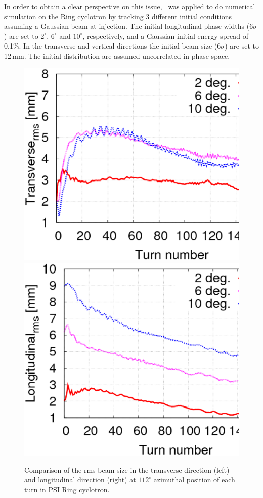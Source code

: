 \documentclass{JAC2003}
\begin{document}
In order to obtain a clear perspective on this issue, \opalcycl \  was applied to do numerical simulation on the Ring cyclotron by tracking 3
different initial conditions assuming a Gaussian beam at injection. The initial longitudinal phase widths (6$\sigma$) are set to $2^\circ$, $6^\circ$ and $10^\circ$, respectively,
and a Gaussian initial energy spread of 0.1\%. In the transverse and vertical directions the initial beam size (6$\sigma$) are set to 12\,mm. 
The initial distribution are assumed uncorrelated in phase space.
\begin{figure}
  \centering
  \includegraphics*[width=0.45\linewidth]{figures/Comp-Transverse.ps}
  \includegraphics*[width=0.45\linewidth]{figures/Comp-Longitudinal.ps}
  \caption{Comparison of the rms beam size in the transverse direction (left) and longitudinal direction (right) at $112^\circ$ azimuthal position of each turn 
    in PSI Ring cyclotron. }
  \label{fig:RMSsize}
\end{figure}
\end{document}
